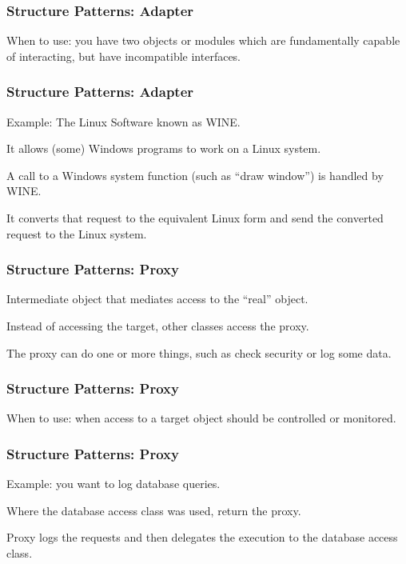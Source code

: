 \begin{frame}
\frametitle{Structure Patterns: Adapter}
\begin{changemargin}{1cm}

When to use: you have two objects or modules which are fundamentally capable of interacting, but have incompatible interfaces.

\end{changemargin}
\end{frame}

\begin{frame}
\frametitle{Structure Patterns: Adapter}
\begin{changemargin}{1cm}

Example: The Linux Software known as WINE. 

It allows (some) Windows programs to work on a Linux system. 

A call to a Windows system function (such as ``draw window'') is handled by WINE.

It converts that request to the equivalent Linux form and send the converted request to the Linux system. 

\end{changemargin}
\end{frame}

\begin{frame}
\frametitle{Structure Patterns: Proxy}
\begin{changemargin}{1cm}

Intermediate object that mediates access to the ``real'' object.

Instead of accessing the target, other classes access the proxy.

The proxy can do one or more things, such as check security or log some data.

\end{changemargin}
\end{frame}

\begin{frame}
\frametitle{Structure Patterns: Proxy}
\begin{changemargin}{1cm}

When to use: when access to a target object should be controlled or monitored.

\end{changemargin}
\end{frame}

\begin{frame}
\frametitle{Structure Patterns: Proxy}
\begin{changemargin}{1cm}

Example: you want to log database queries. 

Where the database access class was used, return the proxy.

Proxy logs the requests and then delegates the execution to the database access class.

\end{changemargin}
\end{frame}

